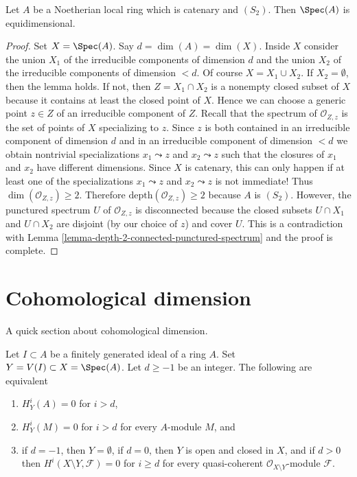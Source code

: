 \begin{lemma}
\label{lemma-catenary-S2-equidimensional}
\begin{reference}
\cite[Corollary 5.10.9]{EGA}
\end{reference}
Let $A$ be a Noetherian local ring which is catenary and $(S_2)$.
Then $\Spec(A)$ is equidimensional.
\end{lemma}

\begin{proof}
Set $X = \Spec(A)$. Say $d = \dim(A) = \dim(X)$. Inside $X$ consider the
union $X_1$ of the irreducible components of dimension $d$ and the union
$X_2$ of the irreducible components of dimension $< d$. Of course
$X = X_1 \cup X_2$. If $X_2 = \emptyset$,
then the lemma holds. If not, then $Z = X_1 \cap X_2$ is a nonempty closed
subset of $X$ because it contains at least the closed point of $X$.
Hence we can choose a generic point $z \in Z$ of an irreducible component
of $Z$. Recall that the spectrum of $\mathcal{O}_{Z, z}$ is the set of points
of $X$ specializing to $z$. Since $z$ is both contained in an
irreducible component of dimension $d$ and in an irreducible component
of dimension $< d$ we obtain nontrivial specializations $x_1 \leadsto z$ and
$x_2 \leadsto z$ such that the closures of $x_1$ and $x_2$ have different
dimensions. Since $X$ is catenary, this can only happen if at least
one of the specializations $x_1 \leadsto z$ and $x_2 \leadsto z$ is not
immediate! Thus $\dim(\mathcal{O}_{Z, z}) \geq 2$. Therefore
$\text{depth}(\mathcal{O}_{Z, z}) \geq 2$ because $A$ is $(S_2)$.
However, the punctured spectrum $U$ of $\mathcal{O}_{Z, z}$ is disconnected
because the closed subsets $U \cap X_1$ and $U \cap X_2$ are disjoint
(by our choice of $z$) and cover $U$. This is a contradiction with
Lemma \ref{lemma-depth-2-connected-punctured-spectrum}
and the proof is complete.
\end{proof}



\section{Cohomological dimension}
\label{section-cd}

\noindent
A quick section about cohomological dimension.

\begin{lemma}
\label{lemma-cd}
Let $I \subset A$ be a finitely generated ideal of a ring $A$.
Set $Y = V(I) \subset X = \Spec(A)$. Let $d \geq -1$ be an integer.
The following are equivalent
\begin{enumerate}
\item $H^i_Y(A) = 0$ for $i > d$,
\item $H^i_Y(M) = 0$ for $i > d$ for every $A$-module $M$, and
\item if $d = -1$, then $Y = \emptyset$, if $d = 0$, then
$Y$ is open and closed in $X$, and if $d > 0$ then
$H^i(X \setminus Y, \mathcal{F}) = 0$ for $i \geq d$
for every quasi-coherent $\mathcal{O}_{X \setminus Y}$-module $\mathcal{F}$.
\end{enumerate}
\end{lemma}

